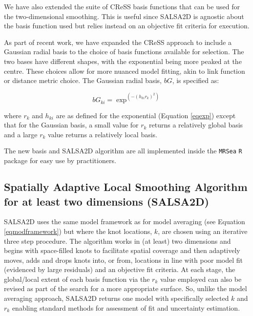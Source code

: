 \documentclass[letterpaper, 12pt]{interact}
\begin{document}
	We have also extended the suite of CReSS basis functions that can be used for the two-dimensional smoothing. This is useful since SALSA2D is agnostic about the basis function used but relies instead on an objective fit criteria for execution.
	
	As part of recent work, we have expanded the CReSS approach to include a Gaussian radial basis to the choice of basis functions available for selection. The two bases have different shapes, with the exponential being more peaked at the centre.  These choices allow for more nuanced model fitting, akin to link function or distance metric choice. The Gaussian radial basis, \(bG\), is specified as:
	
	\begin{equation}\label{eqgau}
		bG_{ki} = \exp^{(-(h_{ki}r_k)^2)}
	\end{equation}
	
	where \(r_k\) and \(h_{ki}\) are as defined for the exponential (Equation \ref{eqexp}) except that for the Gaussian basis, a small value for \(r_k\) returns a relatively global basis and a large \(r_k\) value returns a relatively local basis.
	
	The new basis and SALSA2D algorithm are all implemented inside the \texttt{MRSea} \texttt{R} package \cite{scott2017, Rcran2019} for easy use by practitioners.
	
	
	
	\subsection*{Spatially Adaptive Local Smoothing Algorithm for at least two dimensions (SALSA2D)}\label{spatially-adaptive-local-smoothing-algorithm-for-at-least-two-dimensions-salsa2d}
	
	SALSA2D uses the same model framework as for model averaging (see Equation \ref{eqmodframework}) but where the knot locations, $k$, are chosen using an iterative three step procedure. The algorithm works in (at least) two dimensions and begins with space-filled knots to facilitate spatial coverage and then adaptively moves, adds and drops knots into, or from, locations in line with poor model fit (evidenced by large residuals) and an objective fit criteria. At each stage, the global/local extent of each basis function via the \(r_k\) value employed can also be revised as part of the search for a more appropriate surface. So, unlike the model averaging approach, SALSA2D returns one model with specifically selected $k$ and $r_k$ enabling standard methods for assessment of fit and uncertainty estimation. 
	
\end{document}
